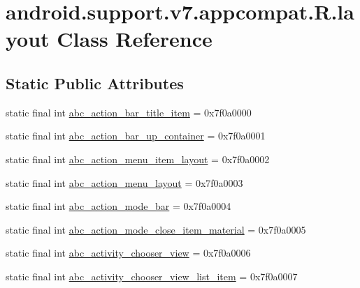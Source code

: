 \hypertarget{classandroid_1_1support_1_1v7_1_1appcompat_1_1_r_1_1layout}{}\section{android.\+support.\+v7.\+appcompat.\+R.\+layout Class Reference}
\label{classandroid_1_1support_1_1v7_1_1appcompat_1_1_r_1_1layout}
\subsection*{Static Public Attributes}
\begin{DoxyCompactItemize}
\item 
static final int \mbox{\hyperlink{classandroid_1_1support_1_1v7_1_1appcompat_1_1_r_1_1layout_aec65987e63e9073748bd15e578bfe898}{abc\+\_\+action\+\_\+bar\+\_\+title\+\_\+item}} = 0x7f0a0000
\item 
static final int \mbox{\hyperlink{classandroid_1_1support_1_1v7_1_1appcompat_1_1_r_1_1layout_aef35fa753f14bda2de42d62e894d5d48}{abc\+\_\+action\+\_\+bar\+\_\+up\+\_\+container}} = 0x7f0a0001
\item 
static final int \mbox{\hyperlink{classandroid_1_1support_1_1v7_1_1appcompat_1_1_r_1_1layout_a90577c306263ff0ba660407c3bb14473}{abc\+\_\+action\+\_\+menu\+\_\+item\+\_\+layout}} = 0x7f0a0002
\item 
static final int \mbox{\hyperlink{classandroid_1_1support_1_1v7_1_1appcompat_1_1_r_1_1layout_ae15076d5fd1b165883c87e6283dde5f9}{abc\+\_\+action\+\_\+menu\+\_\+layout}} = 0x7f0a0003
\item 
static final int \mbox{\hyperlink{classandroid_1_1support_1_1v7_1_1appcompat_1_1_r_1_1layout_aec4f9e9f9a05a5ca2232a456cb5a6138}{abc\+\_\+action\+\_\+mode\+\_\+bar}} = 0x7f0a0004
\item 
static final int \mbox{\hyperlink{classandroid_1_1support_1_1v7_1_1appcompat_1_1_r_1_1layout_a5ca5842a7ac8daaf24b3ac54dddca7ac}{abc\+\_\+action\+\_\+mode\+\_\+close\+\_\+item\+\_\+material}} = 0x7f0a0005
\item 
static final int \mbox{\hyperlink{classandroid_1_1support_1_1v7_1_1appcompat_1_1_r_1_1layout_aee776be71fc6f95ebb7fc202d1653d33}{abc\+\_\+activity\+\_\+chooser\+\_\+view}} = 0x7f0a0006
\item 
static final int \mbox{\hyperlink{classandroid_1_1support_1_1v7_1_1appcompat_1_1_r_1_1layout_ac10665103daed966ab8508cf99909639}{abc\+\_\+activity\+\_\+chooser\+\_\+view\+\_\+list\+\_\+item}} = 0x7f0a0007

\end{DoxyCompactItemize}
